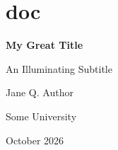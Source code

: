 \section{doc}

{\noindent\LARGE\bfseries My Great Title\par}

{\noindent An Illuminating Subtitle\par}

{\noindent\large Jane Q. Author\par}

{\noindent Some University\par}

{\noindent\large October 2026\par}\medskip

